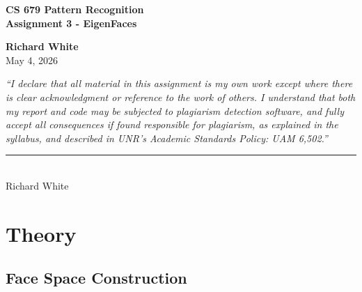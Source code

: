 \documentclass[12pt, letterpaper]{article}
\begin{document}
\begin{titlepage}
	\centering
	\vspace*{2cm}

	{\LARGE \textbf{CS 679 Pattern Recognition}}\\[0.5cm]

	{\Large \textbf{Assignment 3 - EigenFaces}}\\[0.5cm]

	\vfill

	{\large \textbf{Richard White}}\\[0.3cm]
	{\normalsize May 4, 2026}\\[1cm]

	\vfill

	\begin{minipage}{0.85\textwidth}
		\small
		\textit{``I declare that all material in this assignment is my own work except where there is clear
			acknowledgment or reference to the work of others. I understand that both my report and code may be
			subjected to plagiarism detection software, and fully accept all consequences if found responsible for
			plagiarism, as explained in the syllabus, and described in UNR’s Academic Standards Policy: UAM
			6,502.''}

		\vspace{1cm}
		\noindent\rule{6cm}{0.4pt}\\
		Richard White
	\end{minipage}

	\vspace{2cm}
\end{titlepage}

\tableofcontents
\newpage

\section{Theory}

\subsection{Face Space Construction}

\end{document}
